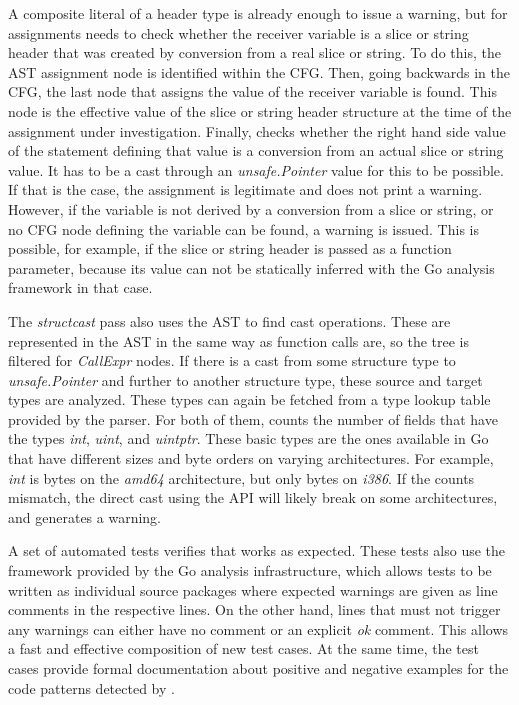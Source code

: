 

A composite literal of a header type is already enough to issue a warning, but for assignments \toolSafer{} needs to
check whether the receiver variable is a slice or string header that was created by conversion from a real slice or
string.
To do this, the \acrshort{AST} assignment node is identified within the \acrshort{CFG}.
Then, going backwards in the \acrshort{CFG}, the last node that assigns the value of the receiver variable is found.
This node is the effective value of the slice or string header structure at the time of the assignment under
investigation.
Finally, \toolSafer{} checks whether the right hand side value of the statement defining that value is a conversion
from an actual slice or string value.
It has to be a cast through an \textit{unsafe.Pointer} value for this to be possible.
If that is the case, the assignment is legitimate and \toolSafer{} does not print a warning.
However, if the variable is not derived by a conversion from a slice or string, or no \acrshort{CFG} node defining the
variable can be found, a warning is issued.
This is possible, for example, if the slice or string header is passed as a function parameter, because its value can
not be statically inferred with the Go analysis framework in that case.

The \textit{structcast} pass also uses the \acrshort{AST} to find cast operations.
These are represented in the \acrshort{AST} in the same way as function calls are, so the tree is filtered for
\textit{CallExpr} nodes.
If there is a cast from some structure type to \textit{unsafe.Pointer} and further to another structure type, these
source and target types are analyzed.
These types can again be fetched from a type lookup table provided by the parser.
For both of them, \toolSafer{} counts the number of fields that have the types \textit{int}, \textit{uint}, and
\textit{uintptr}.
These  basic types are the ones available in Go that have different sizes and byte orders on varying
architectures.
For example, \textit{int} is  bytes on the \textit{amd64} architecture, but only  bytes
on \textit{i386}.
If the counts mismatch, the direct cast using the \unsafe{} \acrshort{API} will likely break on some architectures,
and \toolSafer{} generates a warning.

A set of automated tests verifies that \toolSafer{} works as expected.
These tests also use the framework provided by the Go analysis infrastructure, which allows tests to be written as
individual source packages where expected warnings are given as line comments in the respective lines.
On the other hand, lines that must not trigger any warnings can either have no comment or an explicit \textit{ok}
comment.
This allows a fast and effective composition of new test cases.
At the same time, the test cases provide formal documentation about positive and negative examples for the code patterns
detected by \toolSafer{}.


